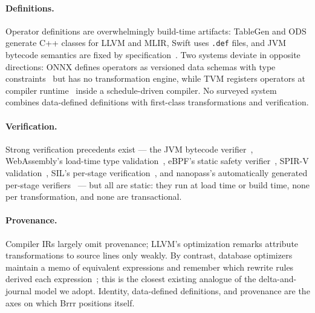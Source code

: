 \paragraph{Definitions.} Operator definitions are overwhelmingly build-time artifacts:
TableGen and ODS generate C++ classes for LLVM and MLIR, Swift uses \texttt{.def}
files, and JVM bytecode semantics are fixed by specification~\cite{jvmspec}. Two
systems deviate in opposite directions: ONNX defines operators as versioned data
schemas with type constraints~\cite{onnx} but has no transformation engine, while TVM
registers operators at compiler runtime~\cite{chen2018tvm} inside a schedule-driven
compiler. No surveyed system combines data-defined definitions with first-class
transformations and verification.

\paragraph{Verification.} Strong verification precedents exist — the JVM bytecode
verifier~\cite{jvmspec}, WebAssembly's load-time type validation~\cite{haas2017wasm},
eBPF's static safety verifier~\cite{ebpf}, SPIR-V validation~\cite{spirvspec}, SIL's
per-stage verification~\cite{swiftsil}, and nanopass's automatically generated
per-stage verifiers~\cite{keep2013nanopass} — but all are static: they run at load
time or build time, none per transformation, and none are transactional.

\paragraph{Provenance.} Compiler IRs largely omit provenance; LLVM's optimization
remarks attribute transformations to source lines only weakly. By contrast, database
optimizers maintain a memo of equivalent expressions and remember which rewrite rules
derived each expression~\cite{graefe1995cascades}; this is the closest existing
analogue of the delta-and-journal model we adopt. Identity, data-defined definitions,
and provenance are the axes on which Brrr positions itself.
